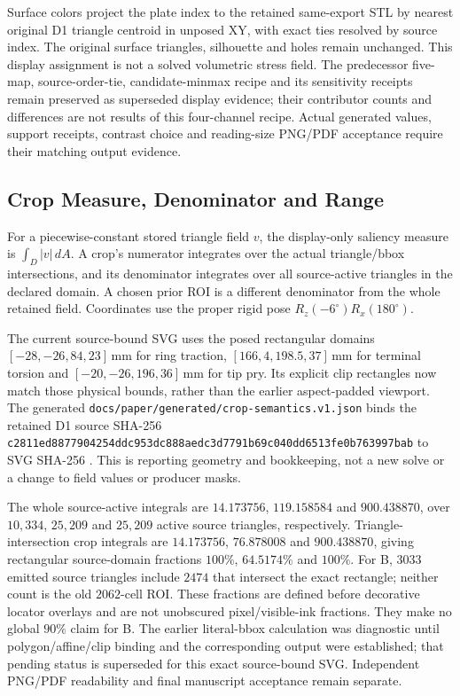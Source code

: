 Surface colors project the plate index to the retained same-export STL by nearest original D1 triangle centroid in unposed XY, with exact ties resolved by source index. The original surface triangles, silhouette and holes remain unchanged. This display assignment is not a solved volumetric stress field. The predecessor five-map, source-order-tie, candidate-minmax recipe and its sensitivity receipts remain preserved as superseded display evidence; their contributor counts and differences are not results of this four-channel recipe. Actual generated values, support receipts, contrast choice and reading-size PNG/PDF acceptance require their matching output evidence.

\subsection{Crop Measure, Denominator and Range}
For a piecewise-constant stored triangle field $v$, the display-only saliency measure is $\int_D |v|\,dA$. A crop's numerator integrates over the actual triangle/bbox intersections, and its denominator integrates over all source-active triangles in the declared domain. A chosen prior ROI is a different denominator from the whole retained field. Coordinates use the proper rigid pose $R_z(-6^\circ)R_x(180^\circ)$.

The current source-bound SVG uses the posed rectangular domains $[-28,-26,84,23]\,\mathrm{mm}$ for ring traction, $[166,4,198.5,37]\,\mathrm{mm}$ for terminal torsion and $[-20,-26,196,36]\,\mathrm{mm}$ for tip pry. Its explicit clip rectangles now match those physical bounds, rather than the earlier aspect-padded viewport. The generated \nolinkurl{docs/paper/generated/crop-semantics.v1.json} binds the retained D1 source SHA-256 \nolinkurl{c2811ed8877904254ddc953dc888aedc3d7791b69c040dd6513fe0b763997bab} to SVG SHA-256 . This is reporting geometry and bookkeeping, not a new solve or a change to field values or producer masks.

The whole source-active integrals are $14.173756$, $119.158584$ and $900.438870$, over $10{,}334$, $25{,}209$ and $25{,}209$ active source triangles, respectively. Triangle-intersection crop integrals are $14.173756$, $76.878008$ and $900.438870$, giving rectangular source-domain fractions $100\%$, $64.5174\%$ and $100\%$. For B, $3033$ emitted source triangles include $2474$ that intersect the exact rectangle; neither count is the old $2062$-cell ROI. These fractions are defined before decorative locator overlays and are not unobscured pixel/visible-ink fractions. They make no global $90\%$ claim for B. The earlier literal-bbox calculation was diagnostic until polygon/affine/clip binding and the corresponding output were established; that pending status is superseded for this exact source-bound SVG. Independent PNG/PDF readability and final manuscript acceptance remain separate.

